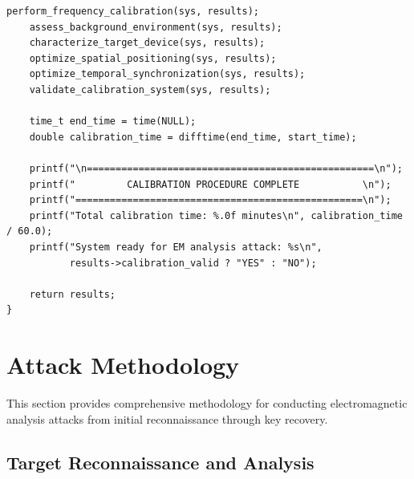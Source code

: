 \documentclass[11pt,a4paper]{article}
\theoremstyle{definition}
\begin{document}
\begin{lstlisting}[caption={Complete EM Calibration Implementation}]
    perform_frequency_calibration(sys, results);
    assess_background_environment(sys, results);
    characterize_target_device(sys, results);
    optimize_spatial_positioning(sys, results);
    optimize_temporal_synchronization(sys, results);
    validate_calibration_system(sys, results);
    
    time_t end_time = time(NULL);
    double calibration_time = difftime(end_time, start_time);
    
    printf("\n==================================================\n");
    printf("         CALIBRATION PROCEDURE COMPLETE           \n");
    printf("==================================================\n");
    printf("Total calibration time: %.0f minutes\n", calibration_time / 60.0);
    printf("System ready for EM analysis attack: %s\n", 
           results->calibration_valid ? "YES" : "NO");
    
    return results;
}
\end{lstlisting}

\section{Attack Methodology}

This section provides comprehensive methodology for conducting electromagnetic analysis attacks from initial reconnaissance through key recovery.

\subsection{Target Reconnaissance and Analysis}
\end{document}
